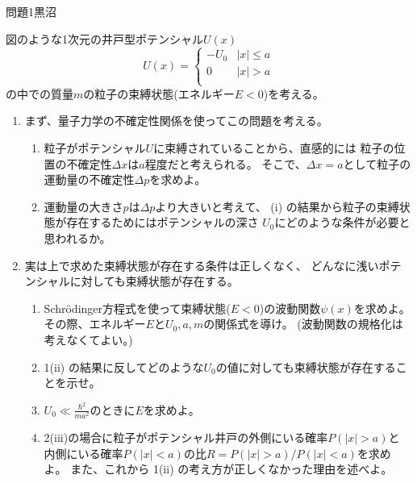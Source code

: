 \documentclass[fleqn]{jbook}
\begin{document}
\begin{question}{問題1}{黒沼}
\parbox[b]{100mm}{図のような1次元の井戸型ポテンシャル$U(x)$
\[
U(x)=
\left\{
  \begin{array}{cc}
   -U_0    & |x|\le a   \\
    0      & |x| >  a   \\
  \end{array}
\right.
\]
の中での質量$m$の粒子の束縛状態(エネルギー$E<0$)を考える。}
\parbox[t]{60mm}{

}


\begin{enumerate}
  \item まず、量子力学の不確定性関係を使ってこの問題を考える。
	\begin{enumerate}
  	  \item {}粒子がポテンシャル$U$に束縛されていることから、直感的には
  	  	粒子の位置の不確定性$\Delta x$は$a$程度だと考えられる。
  	  	そこで、$\Delta x=a$として粒子の運動量の不確定性$\Delta p$を求めよ。
  	  \item {}運動量の大きさ$p$は$\Delta p$より大きいと考えて、
  	  	(i) の結果から粒子の束縛状態が存在するためにはポテンシャルの深さ
  	  	$U_0$にどのような条件が必要と思われるか。
	\end{enumerate}
  \item 実は上で求めた束縛状態が存在する条件は正しくなく、
  	どんなに浅いポテンシャルに対しても束縛状態が存在する。	
  	\begin{enumerate}
  	  \item Schr\"odinger方程式を使って束縛状態($E<0$)の波動関数$\psi(x)$を求めよ。
  	  	その際、エネルギー$E$と$U_0,a,m$の関係式を導け。
  	  	(波動関数の規格化は考えなくてよい。)
  	  \item 1(ii) の結果に反してどのような$U_0$の値に対しても束縛状態が存在することを示せ。
  	  \item {}$U_0\ll \frac{\hbar^2}{ma^2}$のときに$E$を求めよ。
  	  \item 2(iii)の場合に粒子がポテンシャル井戸の外側にいる確率$P(|x|>a)$と
  	  	内側にいる確率$P(|x|<a)$の比$R=P(|x|>a)/P(|x|<a)$を求めよ。
  	  	また、これから 1(ii) の考え方が正しくなかった理由を述べよ。
	\end{enumerate}
\end{enumerate}


\end{question}
\end{document}
